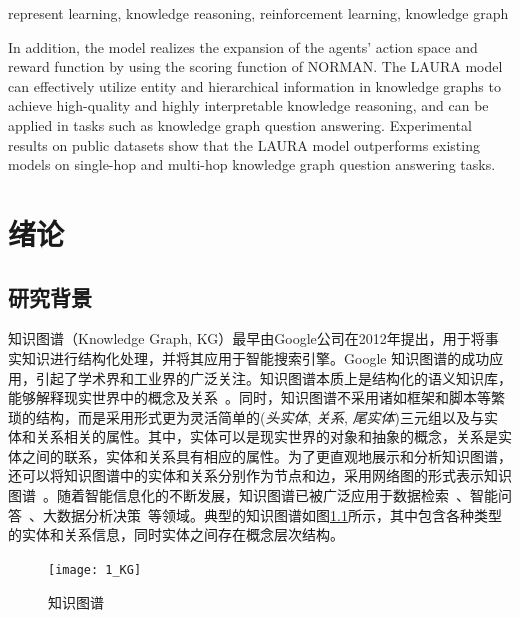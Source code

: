 \documentclass[algorithmlist, AutoFakeBold, AutoFakeSlant, figurelist, tablelist, nomlist, engineering]{seuthesix}
\begin{document}
\begin{englishabstract}{represent learning, knowledge reasoning, reinforcement learning, knowledge graph}
\begin{itemize}
    In addition, the model realizes the expansion of the agents' action space and reward function by using the scoring function of NORMAN.
    The LAURA model can effectively utilize entity and hierarchical information in knowledge graphs to achieve high-quality and highly interpretable knowledge reasoning, and can be applied in tasks such as knowledge graph question answering.
    Experimental results on public datasets show that the LAURA model outperforms existing models on single-hop and multi-hop knowledge graph question answering tasks.
  \end{itemize}
\end{englishabstract} 

\tableofcontents
\mainmatter  %

\chapter{绪论}
\section{研究背景}
知识图谱（Knowledge Graph, KG）最早由Google公司在2012年提出，用于将事实知识进行结构化处理，并将其应用于智能搜索引擎。Google 知识图谱的成功应用，引起了学术界和工业界的广泛关注。知识图谱本质上是结构化的语义知识库，能够解释现实世界中的概念及关系~\cite{nickel2015review}。同时，知识图谱不采用诸如框架和脚本等繁琐的结构，而是采用形式更为灵活简单的(\textit{头实体}, \textit{关系}, \textit{尾实体})三元组以及与实体和关系相关的属性。其中，实体可以是现实世界的对象和抽象的概念，关系是实体之间的联系，实体和关系具有相应的属性。为了更直观地展示和分析知识图谱，还可以将知识图谱中的实体和关系分别作为节点和边，采用网络图的形式表示知识图谱~\cite{noy2019industry}。随着智能信息化的不断发展，知识图谱已被广泛应用于数据检索~\cite{rinaldi2021semantic,sarhan2021open,li2021research}、智能问答~\cite{li2021improving,do2021developing}、大数据分析决策~\cite{zhou2021geoscience,abu2021relational}等领域。典型的知识图谱如图\ref{1_KG}所示，其中包含各种类型的实体和关系信息，同时实体之间存在概念层次结构。
\begin{figure}[h]
  \centering
  \texttt{[image: 1\_KG]}
  \caption{知识图谱}
  \label{1_KG}
\end{figure}
\end{document}
